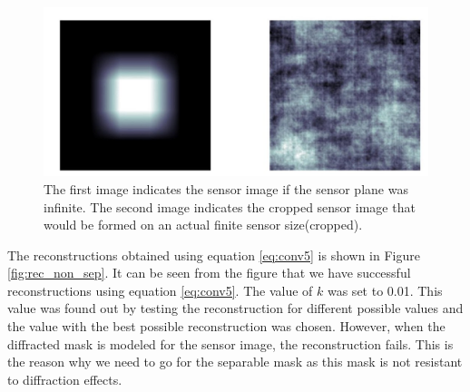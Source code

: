 \begin{figure}[ht]
\includegraphics[scale = 0.50]{pics/sensorCropped}
\caption{The first image indicates the sensor image if the sensor plane was infinite. The second image indicates the cropped sensor image that would be formed on an actual finite sensor size(cropped).}
\label{fig:moon_image}
\end{figure}
The reconstructions obtained using equation \ref{eq:conv5} is shown in Figure \ref{fig:rec_non_sep}. It can be seen from the figure that we have successful reconstructions using equation \ref{eq:conv5}. The value of $k $ was set to 0.01. This value was found out by testing the reconstruction for different possible values and the value with the best possible reconstruction was chosen.
However, when the diffracted mask is modeled for the sensor image, the reconstruction fails. This is the reason why we need to go for the separable mask as this mask is not resistant to diffraction effects. 
